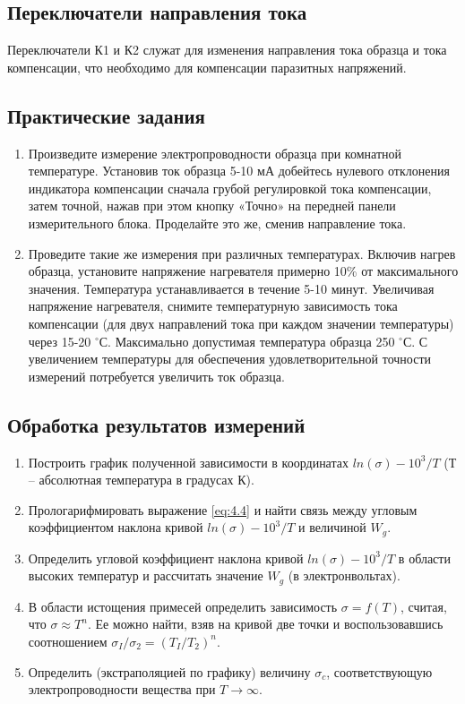 		\subsection{Переключатели направления тока}
		Переключатели К1 и К2 служат для изменения направления тока образца и тока компенсации, что необходимо для компенсации паразитных напряжений.
		
		\subsection*{Практические задания}
		
		\begin{enumerate}
			\item Произведите измерение электропроводности образца при комнатной температуре. Установив ток образца 5-10 мА
			добейтесь нулевого отклонения индикатора компенсации сначала грубой регулировкой тока компенсации, затем точной,
			нажав при этом кнопку «Точно» на передней панели измерительного блока. Проделайте это же, сменив направление тока.
			\item Проведите такие же измерения при различных температурах. Включив нагрев образца, установите напряжение
			нагревателя примерно 10\% от максимального значения. Температура устанавливается в течение 5-10 минут. Увеличивая
			напряжение нагревателя, снимите температурную зависимость тока компенсации (для двух направлений тока при каждом
			значении температуры) через 15-20 $^{\circ}$С. Максимально допустимая температура образца 250 $^{\circ}$С.
			С увеличением температуры для обеспечения удовлетворительной точности измерений потребуется увеличить ток образца.
		\end{enumerate} 


\subsection*{Обработка результатов измерений}
\begin{enumerate}
	\item Построить график полученной зависимости в координатах $ln(\sigma)-10^3/T$ (Т – абсолютная температура в градусах К).
	\item Прологарифмировать выражение \eqref{eq:4.4} и найти связь между угловым коэффициентом наклона кривой
	$ln(\sigma)-10^3/T$ и величиной $W_g$.
	\item Определить угловой коэффициент наклона кривой $ln(\sigma)-10^3/T$ в области высоких температур и рассчитать
	значение $W_g$ (в электронвольтах).
	\item В области истощения примесей определить зависимость $\sigma = f(T)$, считая, что $\sigma \approx T^n$. Ее
	можно найти, взяв на кривой две точки и воспользовавшись соотношением $\sigma_{I} / \sigma_{2}=\left(T_{I} /
	T_{2}\right)^{n}$.
	\item Определить (экстраполяцией по графику) величину $\sigma_c$, соответствующую
	электропроводности вещества при $T \to \infty$.
\end{enumerate}
\newpage
